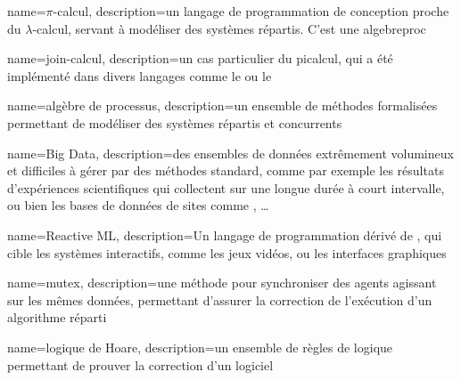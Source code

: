 {
	name={$\pi$-calcul},
	description={un langage de programmation de conception proche du $\lambda$-calcul, servant à modéliser des systèmes répartis. C'est une \gls{algebreproc}}	
}

{
	name={join-calcul}, 
	description={un cas particulier du \gls{picalcul}, qui a été implémenté dans divers langages comme le  ou le }
}

{
	name={algèbre de processus},
	description={un ensemble de méthodes formalisées permettant de modéliser des systèmes répartis et concurrents}
}

{
	name={Big Data},
	description={des ensembles de données extrêmement volumineux et difficiles à gérer par des méthodes standard, comme par exemple les résultats d'expériences scientifiques qui collectent sur une longue durée à court intervalle, ou bien les bases de données de sites comme , \dots}
}

{
	name={Reactive ML},
	description={Un langage de programmation dérivé de , qui cible les systèmes interactifs, comme les jeux vidéos, ou les interfaces graphiques}	
}

{
	name=mutex,
	description={une méthode pour synchroniser des agents agissant sur les mêmes données, permettant d'assurer la correction de l'exécution d'un algorithme réparti}	
}

{
	name={logique de Hoare},
	description={un ensemble de règles de logique permettant de prouver la correction d'un logiciel}
}